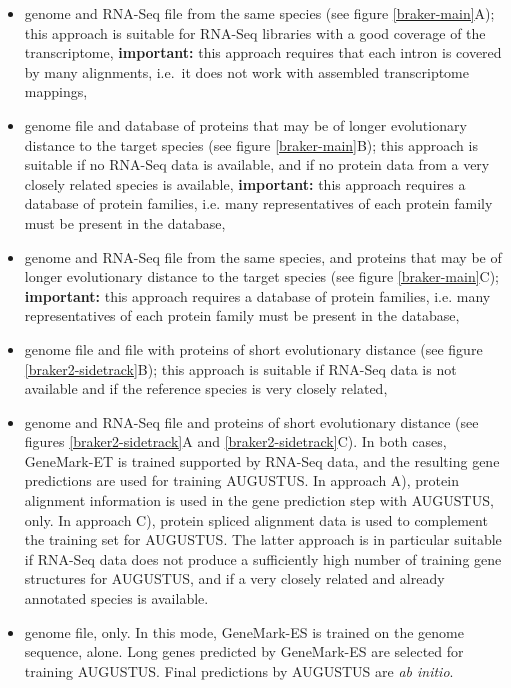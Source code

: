 \documentclass[a4paper,10pt]{report}
\begin{document}
\begin{itemize}
 \item genome and RNA-Seq file from the same species (see figure \ref{braker-main}A); this approach is suitable for RNA-Seq libraries with a good coverage of the transcriptome, \textbf{important:} this approach requires that each intron is covered by many alignments, i.e.~it does not work with assembled transcriptome mappings,
 \item genome file and database of proteins that may be of longer evolutionary distance to the target species (see figure \ref{braker-main}B); this approach is suitable if no RNA-Seq data is available, and if no protein data from a very closely related species is available, \textbf{important:} this approach requires a database of protein families, i.e. many representatives of each protein family must be present in the database, 
 \item genome and RNA-Seq file from the same species, and proteins that may be of longer evolutionary distance to the target species (see figure \ref{braker-main}C); \textbf{important:} this approach requires a database of protein families, i.e. many representatives of each protein family must be present in the database,
 \item genome file and file with proteins of short evolutionary distance (see figure \ref{braker2-sidetrack}B); this approach is suitable if RNA-Seq data is not available and if the reference species is very closely related,
 \item genome and RNA-Seq file and proteins of short evolutionary distance (see figures \ref{braker2-sidetrack}A and \ref{braker2-sidetrack}C). In both cases, GeneMark-ET is trained supported by RNA-Seq data, and the resulting gene predictions are used for training AUGUSTUS. In approach A), protein alignment information is used in the gene prediction step with AUGUSTUS, only. In approach C), protein spliced alignment data is used to complement the training set for AUGUSTUS. The latter approach is in particular suitable if RNA-Seq data does not produce a sufficiently high number of training gene structures for AUGUSTUS, and if a very closely related and already annotated species is available.
 \item genome file, only. In this mode, GeneMark-ES is trained on the genome sequence, alone. Long genes predicted by GeneMark-ES are selected for training AUGUSTUS. Final predictions by AUGUSTUS are \textit{ab initio}.
\end{itemize}
\end{document}
